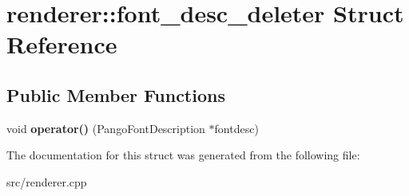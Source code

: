 \hypertarget{structrenderer_1_1font__desc__deleter}{}\section{renderer\+::font\+\_\+desc\+\_\+deleter Struct Reference}
\label{structrenderer_1_1font__desc__deleter}
\subsection*{Public Member Functions}
\begin{DoxyCompactItemize}
\item 
\mbox{\label{structrenderer_1_1font__desc__deleter_ae2b59daac46a17e12fc616dafbe3a63c}} 
void {\bfseries operator()} (Pango\+Font\+Description $\ast$fontdesc)
\end{DoxyCompactItemize}


The documentation for this struct was generated from the following file\+:\begin{DoxyCompactItemize}
\item 
src/renderer.\+cpp\end{DoxyCompactItemize}
